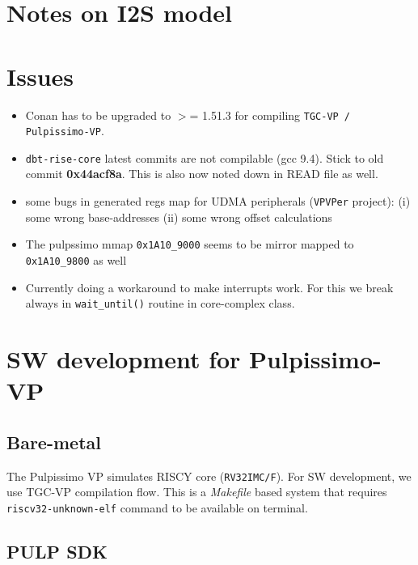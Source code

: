 \documentclass{article}
\begin{document}
\section{Notes on I2S model}

\section{Issues}
\begin{itemize}
 \item Conan has to be upgraded to $>$= 1.51.3 for compiling \texttt{TGC-VP / Pulpissimo-VP}.
 \item \texttt{dbt-rise-core} latest commits are not compilable (gcc 9.4). Stick to old commit \textbf{0x44acf8a}.
       This is also now noted down in READ file as well.
 \item some bugs in generated regs map for UDMA peripherals (\texttt{VPVPer} project):
       (i) some wrong base-addresses (ii) some wrong offset calculations
 \item The pulpssimo mmap \texttt{0x1A10\_9000} seems to be mirror mapped to \texttt{0x1A10\_9800} as well
 \item Currently doing a workaround to make interrupts work. For this we break always in \texttt{wait\_until()}
       routine in core-complex class. 
\end{itemize}

\section{SW development for Pulpissimo-VP}
\subsection{Bare-metal}
The Pulpissimo VP simulates RISCY core (\texttt{RV32IMC/F}). For SW development, we use
TGC-VP compilation flow. This is a \textit{Makefile} based system that requires \texttt{riscv32-unknown-elf}
command to be available on terminal.

\subsection{PULP SDK}

\newpage
\end{document}
